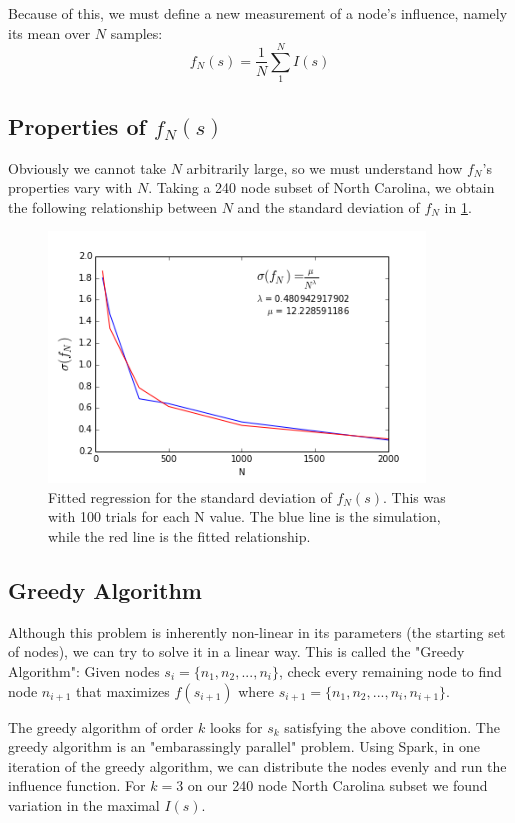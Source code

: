 \documentclass{article}
\begin{document}
	Because of this, we must define a new measurement of a node's influence, namely its mean over $N$ samples:
		\begin{equation}
		\boxed{
			f_N(s) = \frac{1}{N}\sum_1^N I(s)
		}
		\end{equation}
		
		
		
	\subsection{Properties of $f_N(s)$}
	Obviously we cannot take $N$ arbitrarily large, so we must understand how $f_N$'s properties vary with $N$. Taking a 240 node subset of North Carolina, we obtain the following relationship between $N$ and the standard deviation of $f_N$ in \ref{fig:lambda}.
	
		\begin{figure}[h!]
			\centering
			\includegraphics[width=100mm]{lambda_regression.png}
			\caption{Fitted regression for the standard deviation of $f_N(s)$. This was with 100 trials for each N value. The blue line is the simulation, while the red line is the fitted relationship.}
			\label{fig:lambda}
		\end{figure}
			
	
	\subsection{Greedy Algorithm}
		Although this problem is inherently non-linear in its parameters (the starting set of nodes), we can try to solve it in a linear way. This is called the "Greedy Algorithm":
		Given nodes $s_i = \{n_1, n_2,..., n_i\}$, check every remaining node to find node ${n_{i+1}}$ that maximizes $f(s_{i+1})$ where $s_{i+1} =  \{n_1, n_2, ..., n_i, n_{i+1}\}$.
		
		The greedy algorithm of order $k$ looks for $s_k$ satisfying the above condition. The greedy algorithm is an "embarassingly parallel" problem. Using Spark, in one iteration of the greedy algorithm, we can distribute the nodes evenly and run the influence function. For $k = 3$ on our 240 node North Carolina subset we found variation in the maximal $I(s)$.
\end{document}
